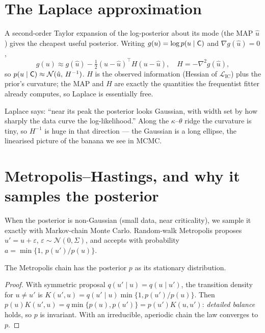 \section{The Laplace approximation}

A second-order Taylor expansion of the log-posterior about its mode (the MAP
$\hat u$) gives the cheapest useful posterior. Writing $g(u)=\log p(u\mid\mathsf{C})$
and $\nabla g(\hat u)=0$,
\begin{equation}
g(u)\approx g(\hat u)-\tfrac12 (u-\hat u)^\top H (u-\hat u),\quad H=-\nabla^2 g(\hat u),
\end{equation}
so $p(u\mid\mathsf{C})\approx\mathcal N(\hat u,\,H^{-1})$. $H$ is the observed
information (Hessian of $\mathcal L_{\mathrm{IC}}$) plus the prior's curvature;
the MAP and $H$ are exactly the quantities the frequentist fitter already
computes, so Laplace is essentially free.

\begin{intuitionbox}
Laplace says: ``near its peak the posterior looks Gaussian, with width set by how
sharply the data curve the log-likelihood.'' Along the $\kappa$--$\theta$ ridge the
curvature is tiny, so $H^{-1}$ is huge in that direction --- the Gaussian is a long
ellipse, the linearised picture of the banana we see in MCMC.
\end{intuitionbox}

\section{Metropolis--Hastings, and why it samples the posterior}

When the posterior is non-Gaussian (small data, near criticality), we sample it
exactly with Markov-chain Monte Carlo. Random-walk Metropolis proposes
$u'=u+\varepsilon$, $\varepsilon\sim\mathcal N(0,\Sigma)$, and accepts with
probability $a=\min\{1,\,p(u')/p(u)\}$.

\begin{proposition}[stationarity]\label{prop:ch7b-detbal}
The Metropolis chain has the posterior $p$ as its stationary distribution.
\end{proposition}
\begin{proof}
With symmetric proposal $q(u'\mid u)=q(u\mid u')$, the transition density for
$u\neq u'$ is $K(u',u)=q(u'\mid u)\min\{1,p(u')/p(u)\}$. Then
$p(u)K(u',u)=q\min\{p(u),p(u')\}=p(u')K(u,u')$: \emph{detailed balance} holds, so
$p$ is invariant. With an irreducible, aperiodic chain the law converges to $p$.
\end{proof}

